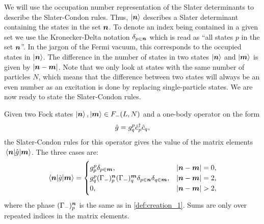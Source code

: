             We will use the occupation number representation of the Slater
            determinants to describe the Slater-Condon rules.
            Thus, $\ket{\boldsymbol{n}}$ describes a Slater determinant containing the
            states in the set $\boldsymbol{n}$.
            To denote an index being contained in a given set we use the
            Kronecker-Delta notation $\delta_{p \in \boldsymbol{n}}$ which is read as
            ``all states $p$ in the set $\boldsymbol{n}$''.
            In the jargon of the Fermi vacuum, this corresponds to the occupied
            states in $\ket{\boldsymbol{n}}$.
            The difference in the number of states in two states $\ket{\boldsymbol{n}}$
            and $\ket{\boldsymbol{m}}$ is given by $\abs{\boldsymbol{n} - \boldsymbol{m}}$.
            Note that we only look at states with the same number of particles
            $N$, which means that the difference between two states will always
            be an even number as an excitation is done by replacing
            single-particle states.
            We are now ready to state the Slater-Condon rules.
            \begin{lemma}
                \label{lemma:slater-condon-one-body}
                Given two Fock states $\ket{\boldsymbol{n}}, \ket{\boldsymbol{m}} \in F_{-}(L,
                N)$ and a one-body operator on the form
                \begin{align}
                    \hat{g} = g^{p}_{q}\hat{c}_{p}^{\dagger}\hat{c}_{q},
                \end{align}
                the Slater-Condon rules for this operator gives the value of the
                matrix elements $\mel{\boldsymbol{n}}{\hat{g}}{\boldsymbol{m}}$.
                The three cases are:
                \begin{gather}
                    \mel{\boldsymbol{n}}{\hat{g}}{\boldsymbol{m}}
                    = \begin{cases}
                        g^{p}_{p}\delta_{p \in \boldsymbol{m}},
                        & \abs{\boldsymbol{n} - \boldsymbol{m}} = 0,
                        \\
                        g^{p}_{q}
                        (\Gamma_{-})^{\boldsymbol{n}}_{p}
                        (\Gamma_{-})^{\boldsymbol{m}}_{q}
                        \delta_{p \in \boldsymbol{n}}
                        \delta_{q \in \boldsymbol{m}},
                        & \abs{\boldsymbol{n} - \boldsymbol{m}} = 2,
                        \\
                        0, & \abs{\boldsymbol{n} - \boldsymbol{m}} > 2,
                    \end{cases}
                \end{gather}
                where the phase $(\Gamma_{-})^{\boldsymbol{n}}_{p}$ is the same as in
                \autoref{def:creation_1}.
                Sums are only over repeated indices in the matrix elements.
            \end{lemma}

